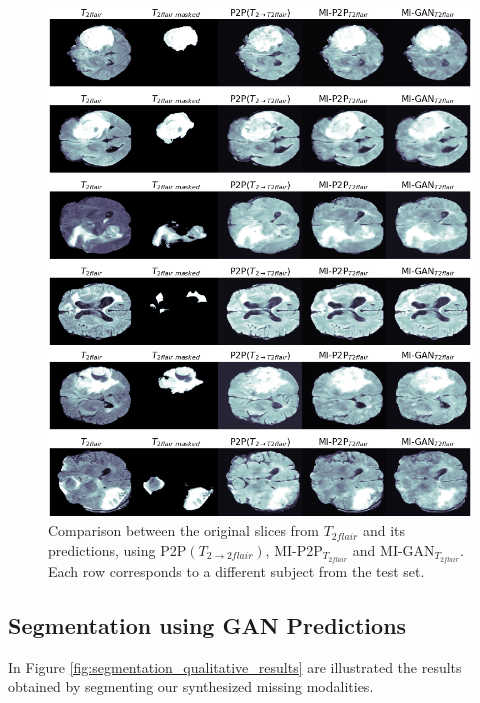 \newpage
\begin{figure}[H]
\centering

\vspace{20mm}


\includegraphics[width=0.635\textheight]{images/gen_t2flair.1.pdf}

\vspace{2mm}

\includegraphics[width=0.635\textheight]{images/gen_t2flair.2.pdf}
\caption[Qualitative results from the generation of $T_{2flair}$]{Comparison between the original slices from $T_{2flair}$ and its predictions, using P2P$(T_{2 \rightarrow 2flair})$, MI-P2P{$_{T_{2flair}}$} and MI-GAN{$_{T_{2flair}}$}. Each row corresponds to a different subject from the test set.}
\label{fig:t2flair_gen}
\end{figure}


\newpage
\subsection{Segmentation using GAN Predictions}
\label{subsec:segmentation_results}
In Figure \ref{fig:segmentation_qualitative_results} are illustrated the results obtained by segmenting our synthesized missing modalities. 


